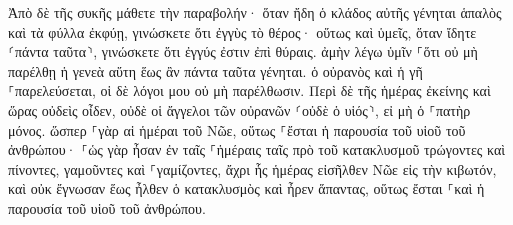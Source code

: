 \documentclass{openreader}
\begin{document}
Ἀπὸ δὲ τῆς συκῆς μάθετε τὴν παραβολήν· ὅταν ἤδη ὁ κλάδος αὐτῆς γένηται ἁπαλὸς καὶ τὰ φύλλα ἐκφύῃ, γινώσκετε ὅτι ἐγγὺς τὸ θέρος· 
οὕτως καὶ ὑμεῖς, ὅταν ἴδητε ⸂πάντα ταῦτα⸃, γινώσκετε ὅτι ἐγγύς ἐστιν ἐπὶ θύραις. 
ἀμὴν λέγω ὑμῖν ⸀ὅτι οὐ μὴ παρέλθῃ ἡ γενεὰ αὕτη ἕως ἂν πάντα ταῦτα γένηται. 
ὁ οὐρανὸς καὶ ἡ γῆ ⸀παρελεύσεται, οἱ δὲ λόγοι μου οὐ μὴ παρέλθωσιν. 
Περὶ δὲ τῆς ἡμέρας ἐκείνης καὶ ὥρας οὐδεὶς οἶδεν, οὐδὲ οἱ ἄγγελοι τῶν οὐρανῶν ⸂οὐδὲ ὁ υἱός⸃, εἰ μὴ ὁ ⸀πατὴρ μόνος. 
ὥσπερ ⸀γὰρ αἱ ἡμέραι τοῦ Νῶε, οὕτως ⸀ἔσται ἡ παρουσία τοῦ υἱοῦ τοῦ ἀνθρώπου· 
⸀ὡς γὰρ ἦσαν ἐν ταῖς ⸀ἡμέραις ταῖς πρὸ τοῦ κατακλυσμοῦ τρώγοντες καὶ πίνοντες, γαμοῦντες καὶ ⸀γαμίζοντες, ἄχρι ἧς ἡμέρας εἰσῆλθεν Νῶε εἰς τὴν κιβωτόν, 
καὶ οὐκ ἔγνωσαν ἕως ἦλθεν ὁ κατακλυσμὸς καὶ ἦρεν ἅπαντας, οὕτως ἔσται ⸀καὶ ἡ παρουσία τοῦ υἱοῦ τοῦ ἀνθρώπου. 
\end{document}
